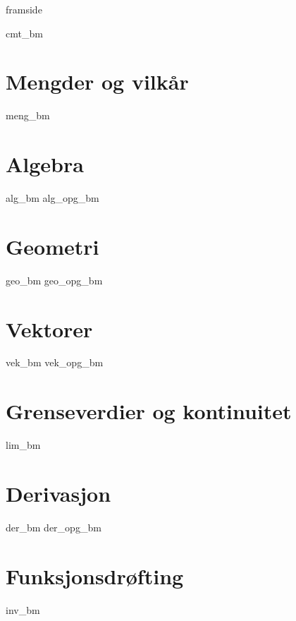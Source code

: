




\addto\captionsenglish{\renewcommand{\figurename}{Figur}}
\makeatletter
\addto\captionsenglish{\renewcommand{\chaptername}{Kapittel}}
\addto\captionsenglish{\renewcommand{\contentsname}{Innhold}}


	
	{framside}
	
	{\footnotesize \tableofcontents}
	\newpage
	
	{cmt_bm}
	
	\chapter{Mengder og vilkår}
	\newpage
	{meng_bm}
	
	\chapter{Algebra}
	\newpage
	{alg_bm}
	{alg_opg_bm}
	
	\chapter{Geometri}
	\newpage
	{geo_bm}
	{geo_opg_bm}	
	
	\chapter{Vektorer}
	\newpage
	{vek_bm}
	{vek_opg_bm}	
		
	\chapter{Grenseverdier og kontinuitet}
	\newpage
	{lim_bm}	
	
	\chapter{Derivasjon} \label{Derivasjon}
	\newpage
	{der_bm}
	{der_opg_bm}	
	
	\chapter{Funksjonsdrøfting}
	\newpage
	{inv_bm}
	\titleformat{\chapter}[hang]
	{\normalfont\LARGE\bfseries}{}{}{\vspace{-1cm}\Huge}
